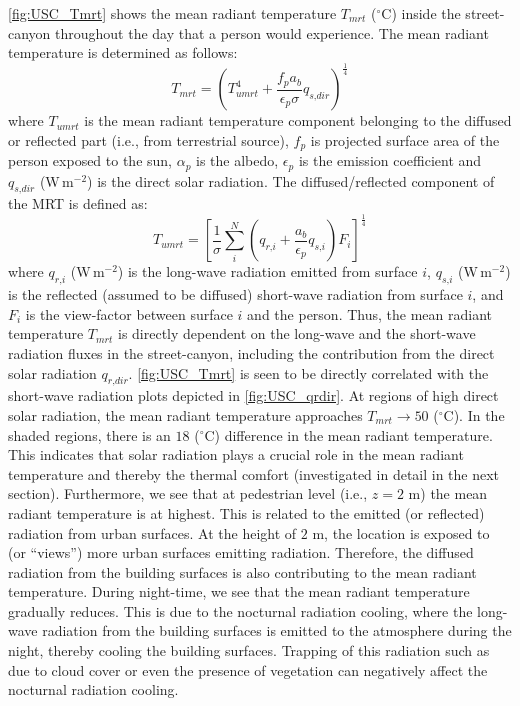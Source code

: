 \cref{fig:USC_Tmrt} shows the mean radiant temperature $T_{\textit{mrt}}$  ($^{\circ}$C) inside the street-canyon throughout the day that a person would experience.  The mean radiant temperature is determined as follows: 
\begin{equation}
T_{\textit{mrt}} = \left( T_{\textit{umrt}}^4  + \frac{f_p a_b}{\epsilon_p \sigma} q_{\textit{s,dir}} \right)^{\frac{1}{4}}
\label{eq:Tmrt2}
\end{equation}
where $T_{\textit{umrt}}$ is the mean radiant temperature component belonging to the diffused or reflected part (i.e., from terrestrial source), $f_p$ is projected surface area of the person exposed to the sun, $\alpha_p$ is the albedo, $\epsilon_p$ is the emission coefficient and $q_{\textit{s,dir}}$ (W\,m$^{-2}$) is the direct solar radiation. The diffused/reflected component of the MRT is defined as:
\begin{equation}
T_{\textit{umrt}} = \left[ \frac{1}{\sigma} \sum_{i}^N \left(q_{\textit{r,i}} + \frac{a_b}{\epsilon_p} q_{\textit{s,i}} \right)F_i\right]^{\frac{1}{4}}
\label{eq:Tumrt2}
\end{equation}
where $q_{\textit{r,i}}$ (W\,m$^{-2}$)  is the long-wave radiation emitted from surface $i$, $q_{\textit{s,i}}$ (W\,m$^{-2}$) is the reflected (assumed to be diffused) short-wave radiation from surface $i$, and $F_i$ is the view-factor between surface $i$ and the person. Thus, the mean radiant temperature $T_{\textit{mrt}}$ is directly dependent on the long-wave and the short-wave radiation fluxes in the street-canyon, including the contribution from the direct solar radiation $q_{\textit{r,dir}}$. \cref{fig:USC_Tmrt} is seen to be directly correlated with the short-wave radiation plots depicted in \cref{fig:USC_qrdir}. At regions of high direct solar radiation, the mean radiant temperature approaches $T_{\textit{mrt}}\rightarrow50$ ($^{\circ}$C). In the shaded regions, there is an $18$  ($^{\circ}$C) difference in the mean radiant temperature. This indicates that solar radiation plays a crucial role in the mean radiant temperature and thereby the thermal comfort (investigated in detail in the next section). Furthermore, we see that at pedestrian level (i.e., $z=2$ m) the mean radiant temperature is at highest. This is related to the emitted (or reflected) radiation from urban surfaces. At the height of $2$ m, the location is exposed to (or ``views'') more urban surfaces emitting radiation. Therefore, the diffused radiation from the building surfaces is also contributing to the mean radiant temperature. During night-time, we see that the mean radiant temperature gradually reduces. This is due to the nocturnal radiation cooling, where the long-wave radiation from the building surfaces is emitted to the atmosphere during the night, thereby cooling the building surfaces. Trapping of this radiation such as due to cloud cover or even the presence of vegetation can negatively affect the nocturnal radiation cooling.

